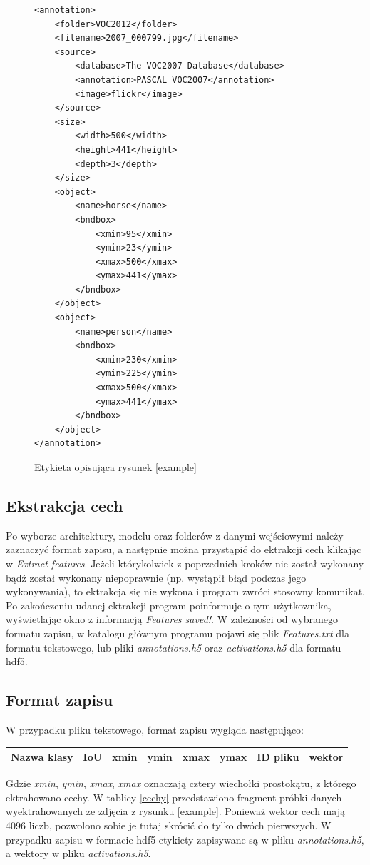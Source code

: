 \documentclass[a4paper,twoside,12pt]{book}
\begin{document}
{\begin{figure}
\centering
\begin{lstlisting}
<annotation>
	<folder>VOC2012</folder>
	<filename>2007_000799.jpg</filename>
	<source>
		<database>The VOC2007 Database</database>
		<annotation>PASCAL VOC2007</annotation>
		<image>flickr</image>
	</source>
	<size>
		<width>500</width>
		<height>441</height>
		<depth>3</depth>
	</size>
	<object>
		<name>horse</name>
		<bndbox>
			<xmin>95</xmin>
			<ymin>23</ymin>
			<xmax>500</xmax>
			<ymax>441</ymax>
		</bndbox>
	</object>
	<object>
		<name>person</name>
		<bndbox>
			<xmin>230</xmin>
			<ymin>225</ymin>
			<xmax>500</xmax>
			<ymax>441</ymax>
		</bndbox>
	</object>
</annotation>

\end{lstlisting}
\caption{Etykieta opisująca rysunek \ref{example}}
\label{etykieta}
\end{figure}
\subsection{Ekstrakcja cech}
{Po wyborze architektury, modelu oraz folderów z danymi wejściowymi należy zaznaczyć format zapisu, a następnie można przystąpić do ektrakcji cech klikając w \emph{Extract features}. Jeżeli którykolwiek z poprzednich kroków nie został wykonany bądź został wykonany niepoprawnie (np. wystąpił błąd podczas jego wykonywania), to ektrakcja się nie wykona i program zwróci stosowny komunikat. Po zakończeniu udanej ektrakcji program poinformuje o tym użytkownika, wyświetlając okno z informacją \emph{Features saved!}. W zależności od wybranego formatu zapisu, w katalogu głównym programu pojawi się plik \emph{Features.txt} dla formatu tekstowego, lub pliki \emph{annotations.h5} oraz  \emph{activations.h5} dla formatu hdf5. }
\subsection{Format zapisu}
{W przypadku pliku tekstowego, format zapisu wygląda następująco:}

\begin{table}[h!]
\centering
\begin{tabular}{|l|l|l|l|l|l|l|l|}
\hline
Nazwa klasy & IoU & xmin & ymin & xmax & ymax & ID pliku & wektor \\
\hline

\end{tabular}
\end{table}  
{Gdzie \emph{xmin}, \emph{ymin}, \emph{xmax}, \emph{xmax} oznaczają cztery wiechołki prostokątu, z którego ektrahowano cechy. W tablicy \ref{cechy} przedstawiono fragment próbki danych wyektrahowanych ze zdjęcia z rysunku \ref{example}. Ponieważ wektor cech mają 4096 liczb, pozwolono sobie je tutaj skrócić do tylko dwóch pierwszych.}
{W przypadku zapisu w formacie hdf5 etykiety zapisywane są w pliku \emph{annotations.h5}, a wektory w pliku \emph{activations.h5}.}
\label{format}



}
\end{document}
